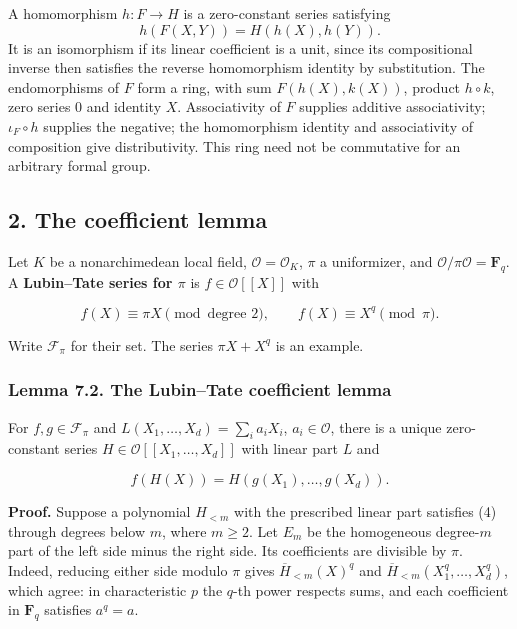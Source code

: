 \documentclass[11pt,a4paper]{article}
\begin{document}
A homomorphism \(h:F\to H\) is a zero-constant series satisfying \[
h(F(X,Y))=H(h(X),h(Y)).
\] It is an isomorphism if its linear coefficient is a unit, since its
compositional inverse then satisfies the reverse homomorphism identity
by substitution. The endomorphisms of \(F\) form a ring, with sum
\(F(h(X),k(X))\), product \(h\circ k\), zero series 0 and identity
\(X\). Associativity of \(F\) supplies additive associativity;
\(\iota_F\circ h\) supplies the negative; the homomorphism identity and
associativity of composition give distributivity. This ring need not be
commutative for an arbitrary formal group.

\subsection{2. The coefficient lemma}\label{the-coefficient-lemma}

Let \(K\) be a nonarchimedean local field, \(\mathcal O=\mathcal O_K\),
\(\pi\) a uniformizer, and \(\mathcal O/\pi\mathcal O=\mathbf F_q\). A
\textbf{Lubin--Tate series for \(\pi\)} is \(f\in\mathcal O[[X]]\) with

\[
f(X)\equiv\pi X\pmod{\text{degree }2},
\qquad f(X)\equiv X^q\pmod\pi.
\tag{3}
\]

Write \(\mathcal F_\pi\) for their set. The series \(\pi X+X^q\) is an
example.

\subsubsection{Lemma 7.2. The Lubin--Tate coefficient
lemma}\label{lemma-7.2.-the-lubintate-coefficient-lemma}

For \(f,g\in\mathcal F_\pi\) and \(L(X_1,\ldots,X_d)=\sum_i a_iX_i\),
\(a_i\in\mathcal O\), there is a unique zero-constant series
\(H\in\mathcal O[[X_1,\ldots,X_d]]\) with linear part \(L\) and

\[
f(H(X))=H(g(X_1),\ldots,g(X_d)).
\tag{4}
\]

\textbf{Proof.} Suppose a polynomial \(H_{<m}\) with the prescribed
linear part satisfies (4) through degrees below \(m\), where \(m\geq2\).
Let \(E_m\) be the homogeneous degree-\(m\) part of the left side minus
the right side. Its coefficients are divisible by \(\pi\). Indeed,
reducing either side modulo \(\pi\) gives \(\overline H_{<m}(X)^q\) and
\(\overline H_{<m}(X_1^q,\ldots,X_d^q)\), which agree: in characteristic
\(p\) the \(q\)-th power respects sums, and each coefficient in
\(\mathbf F_q\) satisfies \(a^q=a\).
\end{document}
